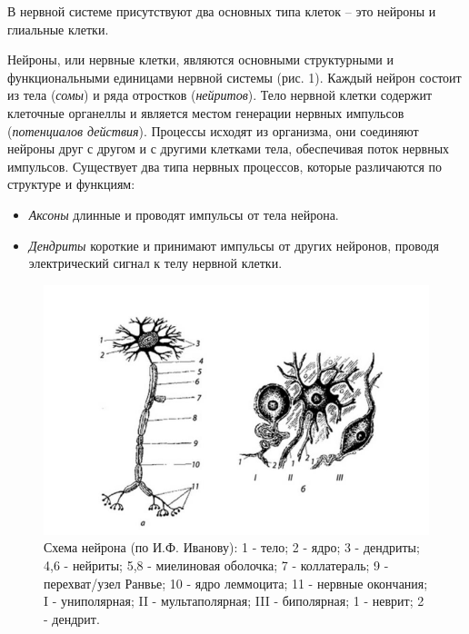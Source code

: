 \documentclass{article}
\begin{document}
        В нервной системе присутствуют два основных типа клеток – это нейроны
        и глиальные клетки.
        \vspace*{4mm}

        Нейроны, или нервные клетки, являются основными структурными и
        функциональными единицами нервной системы (рис. 1). Каждый нейрон
        состоит из тела (\textit{сомы}) и ряда отростков (\textit{нейритов}). Тело нервной клетки
        содержит клеточные органеллы и является местом генерации нервных импульсов
        (\textit{потенциалов действия}). Процессы исходят из организма, они соединяют
        нейроны друг с другом и с другими клетками тела, обеспечивая поток нервных
        импульсов. Существует два типа нервных процессов, которые различаются по
        структуре и функциям:

        \begin{itemize}
            \item \textit{Аксоны} длинные и проводят импульсы от тела нейрона.

            \item \textit{Дендриты} короткие и принимают импульсы от других нейронов,
            проводя электрический сигнал к телу нервной клетки.
        \end{itemize}
        \newpage
        
        \begin{figure}[t]
            \centering
            \includegraphics[width=\textwidth]{data/Нейрон.png}
            \caption{Схема нейрона (по И.Ф. Иванову): 1 - тело; 2 - ядро; 3 - дендриты;
            4,6 - нейриты; 5,8 - миелиновая оболочка; 7 - коллатераль; 9 - перехват/узел Ранвье;
            10 - ядро леммоцита; 11 - нервные окончания; I - униполярная; II - мультаполярная;
            III - биполярная; 1 - неврит; 2 - дендрит.}
        \end{figure}
\end{document}
